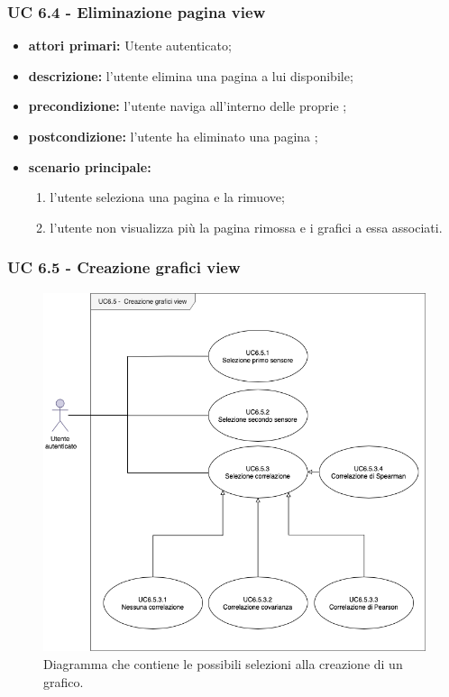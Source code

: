 			\subsubsection{UC 6.4 - Eliminazione pagina view}
			\begin{itemize}
				\item \textbf{attori primari:} Utente autenticato;
				\item \textbf{descrizione:} l'utente elimina una pagina  a lui disponibile;
				\item \textbf{precondizione:} l'utente naviga all'interno delle proprie ;
				\item \textbf{postcondizione:} l'utente ha eliminato una pagina ;
				\item \textbf{scenario principale:}
				\begin{enumerate}
					\item l'utente seleziona una pagina  e la rimuove;
					\item l'utente non visualizza più la pagina  rimossa e i grafici a essa associati.
				\end{enumerate}	
			\end{itemize}

			\subsubsection{UC 6.5 - Creazione grafici view}

			\begin{figure}[H]
				\centering
				\includegraphics[scale=0.60]{res/images/uc6.5}
				\caption{Diagramma che contiene le possibili selezioni alla creazione di un grafico.}
			\end{figure}


